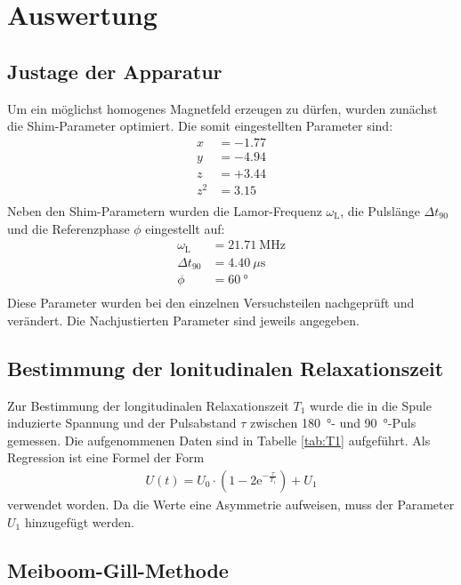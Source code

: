 \newpage
\section{Auswertung}
\label{sec:Auswertung}

\subsection{Justage der Apparatur}
Um ein möglichst homogenes Magnetfeld erzeugen zu dürfen, wurden zunächst die
Shim-Parameter optimiert. Die somit eingestellten Parameter sind:
\begin{align*}
  x &= -\num{1.77}  \\
  y &= -\num{4.94}  \\
  z &= +\num{3.44}  \\
  z^2 &= \num{3.15} \\
\end{align*}
Neben den Shim-Parametern wurden die Lamor-Frequenz $\omega_\text{L}$, die
Pulslänge $\Delta t_\text{90}$ und die Referenzphase $\phi$ eingestellt auf:
\begin{align*}
  \omega_\text{L} &= \SI{21.71}{\mega\hertz} \\
  \Delta t_\text{90} &= \SI{4.40}{\mu\second} \\
  \phi &= \SI{60}{\degree} \\
\end{align*}
Diese Parameter wurden bei den einzelnen Versuchsteilen nachgeprüft und
verändert. Die Nachjustierten Parameter sind jeweils angegeben.

\subsection{Bestimmung der lonitudinalen Relaxationszeit}
Zur Bestimmung der longitudinalen Relaxationszeit $T_1$ wurde die in die
Spule induzierte Spannung und der Pulsabstand $\tau$ zwischen \SI{180}{\degree}-
und \SI{90}{\degree}-Puls gemessen. Die aufgenommenen Daten sind in Tabelle
\ref{tab:T1} aufgeführt. Als Regression ist eine Formel der Form
\begin{align*}
  U(t) = U_0 \cdot \left(1- 2\text{e}^{-\frac{\tau}{T_1}}\right) + U_1
\end{align*}
verwendet worden. Da die Werte eine Asymmetrie aufweisen, muss der Parameter
$U_1$ hinzugefügt werden.

\subsection{Meiboom-Gill-Methode}

